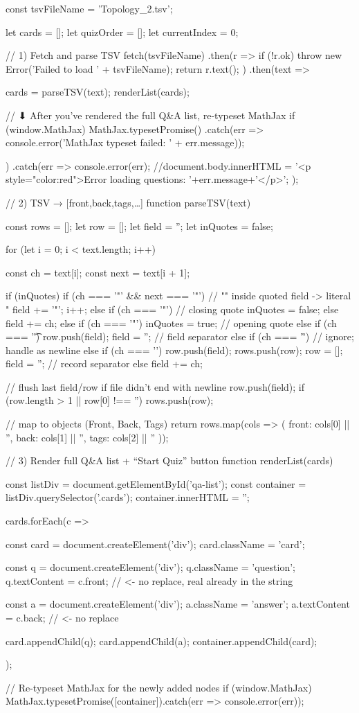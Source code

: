 \documentclass{tstextbook}
\begin{document}
    const tsvFileName = 'Topology_2.tsv';

    let cards = [];
    let quizOrder = [];
    let currentIndex = 0;

    // 1) Fetch and parse TSV
fetch(tsvFileName)
  .then(r => {
    if (!r.ok) throw new Error('Failed to load ' + tsvFileName);
    return r.text();
  })
  .then(text => {
    cards = parseTSV(text);
    renderList(cards);

    // ⬇ After you’ve rendered the full Q&A list, re-typeset MathJax
    if (window.MathJax) {
      MathJax.typesetPromise()
        .catch(err => console.error('MathJax typeset failed: ' + err.message));
    }
  })
  .catch(err => {
    console.error(err);
    //document.body.innerHTML =  '<p style="color:red">Error loading questions: '+err.message+'</p>';
  });

    // 2) TSV → [{front,back,tags},…]
    function parseTSV(text) {
  const rows = [];
  let row = [];
  let field = '';
  let inQuotes = false;

  for (let i = 0; i < text.length; i++) {
    const ch = text[i];
    const next = text[i + 1];

    if (inQuotes) {
      if (ch === '"' && next === '"') {
        // "" inside quoted field -> literal "
        field += '"';
        i++;
      } else if (ch === '"') {
        // closing quote
        inQuotes = false;
      } else {
        field += ch;
      }
    } else {
      if (ch === '"') {
        inQuotes = true;                // opening quote
      } else if (ch === '\t') {
        row.push(field); field = '';    // field separator
      } else if (ch === '\r') {
        // ignore; handle \n as newline
      } else if (ch === '\n') {
        row.push(field); rows.push(row);
        row = []; field = '';           // record separator
      } else {
        field += ch;
      }
    }
  }
  // flush last field/row if file didn't end with newline
  row.push(field);
  if (row.length > 1 || row[0] !== '') rows.push(row);

  // map to objects (Front, Back, Tags)
  return rows.map(cols => ({
    front: cols[0] || '',
    back:  cols[1] || '',
    tags:  cols[2] || ''
  }));
}
// 3) Render full Q&A list + “Start Quiz” button
function renderList(cards) {
  const listDiv = document.getElementById('qa-list');
  const container = listDiv.querySelector('.cards');
  container.innerHTML = '';

  cards.forEach(c => {
    const card = document.createElement('div');
    card.className = 'card';

    const q = document.createElement('div');
    q.className = 'question';
    q.textContent = c.front;   // <- no replace, real \n already in the string

    const a = document.createElement('div');
    a.className = 'answer';
    a.textContent = c.back;    // <- no replace

    card.appendChild(q);
    card.appendChild(a);
    container.appendChild(card);
  });

  // Re-typeset MathJax for the newly added nodes
  if (window.MathJax) {
    MathJax.typesetPromise([container]).catch(err => console.error(err));
  }
}
\end{document}
